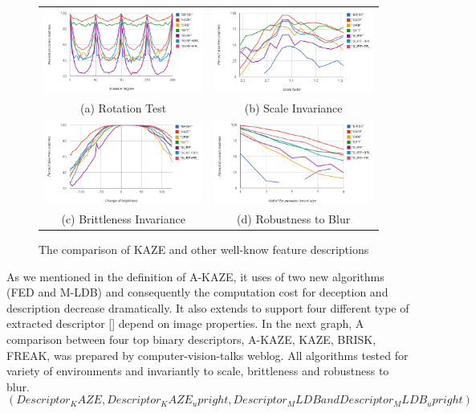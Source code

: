 \begin{figure}[H]
\begin{tabular}{cc}
  \includegraphics[width=75mm]{figures/rotation_KAZE} &  \includegraphics[width=75mm]{figures/scale_KAZE} \\
(a) Rotation Test & (b) Scale Invariance \\[6pt]
 \includegraphics[width=75mm]{figures/brightness_KAZE} &  \includegraphics[width=75mm]{figures/blur_KAZE} \\
(c) Brittleness Invariance & (d) Robustness to Blur \\[6pt]
\end{tabular}
\caption{The comparison of KAZE and other well-know feature descriptions}\label{fig:compare_kaze}
\end{figure}

As we mentioned in the definition of A-KAZE, it uses of two new algorithms (FED and M-LDB) and consequently the computation cost for deception and description decrease dramatically. It also extends to support four different type of extracted descriptor [] depend on image properties. In the next graph, A comparison between four top binary descriptors, A-KAZE, KAZE, BRISK, FREAK, was prepared by computer-vision-talks weblog. All algorithms tested for variety of environments and invariantly to scale, brittleness and robustness to blur.
$$(Descriptor_KAZE, Descriptor_KAZE_upright, Descriptor_MLDB and Descriptor_MLDB_upright)$$


